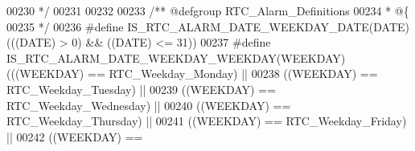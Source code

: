\begin{DoxyCode}
00230 \textcolor{comment}{  */}
00231 
00232 
00233 \textcolor{comment}{/** @defgroup RTC\_Alarm\_Definitions}
00234 \textcolor{comment}{  * @\{}
00235 \textcolor{comment}{  */}
00236 \textcolor{preprocessor}{#}\textcolor{preprocessor}{define} \textcolor{preprocessor}{IS\_RTC\_ALARM\_DATE\_WEEKDAY\_DATE}\textcolor{preprocessor}{(}\textcolor{preprocessor}{DATE}\textcolor{preprocessor}{)} \textcolor{preprocessor}{(}\textcolor{preprocessor}{(}\textcolor{preprocessor}{(}\textcolor{preprocessor}{DATE}\textcolor{preprocessor}{)} \textcolor{preprocessor}{>} 0\textcolor{preprocessor}{)} \textcolor{preprocessor}{&&} \textcolor{preprocessor}{(}\textcolor{preprocessor}{(}\textcolor{preprocessor}{DATE}\textcolor{preprocessor}{)} \textcolor{preprocessor}{<=} 31\textcolor{preprocessor}{)}\textcolor{preprocessor}{)}
00237 \textcolor{preprocessor}{#}\textcolor{preprocessor}{define} \textcolor{preprocessor}{IS\_RTC\_ALARM\_DATE\_WEEKDAY\_WEEKDAY}\textcolor{preprocessor}{(}\textcolor{preprocessor}{WEEKDAY}\textcolor{preprocessor}{)} \textcolor{preprocessor}{(}\textcolor{preprocessor}{(}\textcolor{preprocessor}{(}\textcolor{preprocessor}{WEEKDAY}\textcolor{preprocessor}{)} \textcolor{preprocessor}{==} 
      RTC_Weekday_Monday\textcolor{preprocessor}{)} \textcolor{preprocessor}{||}
00238                                                     \textcolor{preprocessor}{(}\textcolor{preprocessor}{(}\textcolor{preprocessor}{WEEKDAY}\textcolor{preprocessor}{)} \textcolor{preprocessor}{==} 
      RTC_Weekday_Tuesday\textcolor{preprocessor}{)} \textcolor{preprocessor}{||}
00239                                                     \textcolor{preprocessor}{(}\textcolor{preprocessor}{(}\textcolor{preprocessor}{WEEKDAY}\textcolor{preprocessor}{)} \textcolor{preprocessor}{==} 
      RTC_Weekday_Wednesday\textcolor{preprocessor}{)} \textcolor{preprocessor}{||}
00240                                                     \textcolor{preprocessor}{(}\textcolor{preprocessor}{(}\textcolor{preprocessor}{WEEKDAY}\textcolor{preprocessor}{)} \textcolor{preprocessor}{==} 
      RTC_Weekday_Thursday\textcolor{preprocessor}{)} \textcolor{preprocessor}{||}
00241                                                     \textcolor{preprocessor}{(}\textcolor{preprocessor}{(}\textcolor{preprocessor}{WEEKDAY}\textcolor{preprocessor}{)} \textcolor{preprocessor}{==} 
      RTC_Weekday_Friday\textcolor{preprocessor}{)} \textcolor{preprocessor}{||}
00242                                                     \textcolor{preprocessor}{(}\textcolor{preprocessor}{(}\textcolor{preprocessor}{WEEKDAY}\textcolor{preprocessor}{)} \textcolor{preprocessor}{==} 

\end{DoxyCode}
